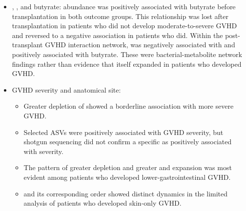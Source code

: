 \documentclass[11pt,a4paper]{article}
\begin{document}
\begin{itemize}
\item \taxFaecalibacterium, \taxClostridiumXIVb, and butyrate: \taxFaecalibacterium abundance was positively associated with butyrate before transplantation in both outcome groups. This relationship was lost after transplantation in patients who did not develop moderate-to-severe GVHD and reversed to a negative association in patients who did. Within the post-transplant GVHD interaction network, \taxClostridiumXIVb was negatively associated with \taxFaecalibacterium and positively associated with butyrate. These were bacterial-metabolite network findings rather than evidence that \taxClostridiumXIVb itself expanded in patients who developed GVHD.

\item GVHD severity and anatomical site:
  \begin{itemize}
  \item Greater depletion of \taxButyricicoccusBare showed a borderline association with more severe GVHD.
  \item Selected \taxBacteroides ASVs were positively associated with GVHD severity, but shotgun sequencing did not confirm a specific \taxBacteroidesSpecies as positively associated with severity.
  \item The pattern of greater \taxClostridiales depletion and greater \taxEfaecium and \taxParabacteroides expansion was most evident among patients who developed lower-gastrointestinal GVHD.
  \item \taxVeillonellaceae and its corresponding order \taxSelenomonadales showed distinct dynamics in the limited analysis of patients who developed skin-only GVHD.
  \end{itemize}

\end{itemize}
\end{document}
